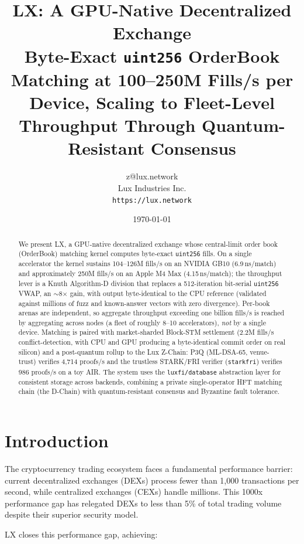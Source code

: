 \documentclass[11pt,a4paper]{article}
\title{\textbf{LX: A GPU-Native Decentralized Exchange} \\
\large{Byte-Exact \texttt{uint256} OrderBook Matching at 100--250M Fills/s per Device,
Scaling to Fleet-Level Throughput Through Quantum-Resistant Consensus}}
\author{
z@lux.network \\
Lux Industries Inc. \\
\texttt{https://lux.network}
}
\date{\today}
\newcommand{\lxdex}{\textsc{LX}}
\begin{document}
\maketitle

\begin{abstract}
We present \lxdex{}, a GPU-native decentralized exchange whose central-limit
order book (OrderBook) matching kernel computes byte-exact \texttt{uint256} fills.
On a single accelerator the kernel sustains 104--126M fills/s on an NVIDIA GB10
(6.9\,ns/match) and approximately 250M fills/s on an Apple M4 Max
(4.15\,ns/match); the throughput lever is a Knuth Algorithm-D division that
replaces a 512-iteration bit-serial \texttt{uint256} VWAP, an $\sim$8$\times$
gain, with output byte-identical to the CPU reference (validated against
millions of fuzz and known-answer vectors with zero divergence). Per-book
arenas are independent, so aggregate throughput exceeding one billion fills/s
is reached by aggregating across nodes (a fleet of roughly 8--10 accelerators),
\emph{not} by a single device. Matching is paired with market-sharded Block-STM
settlement (2.2M fills/s conflict-detection, with CPU and GPU producing a
byte-identical commit order on real silicon) and a post-quantum rollup to the
Lux Z-Chain: P3Q (ML-DSA-65, venue-trust) verifies 4{,}714 proofs/s and the
trustless STARK/FRI verifier (\texttt{starkfri}) verifies 986 proofs/s on a toy
AIR. The system uses the \texttt{luxfi/database} abstraction layer for
consistent storage across backends, combining a private single-operator HFT
matching chain (the D-Chain) with quantum-resistant consensus and Byzantine
fault tolerance.
\end{abstract}

\section{Introduction}

The cryptocurrency trading ecosystem faces a fundamental performance barrier: current decentralized exchanges (DEXs) process fewer than 1,000 transactions per second, while centralized exchanges (CEXs) handle millions. This 1000x performance gap has relegated DEXs to less than 5\% of total trading volume despite their superior security model.

\lxdex{} closes this performance gap, achieving:
\end{document}
